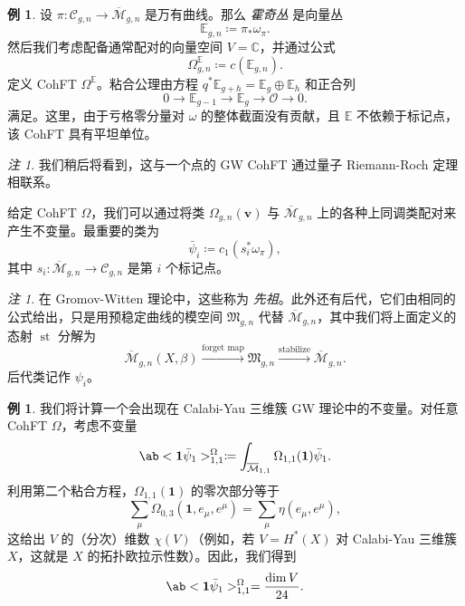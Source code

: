 \documentclass{amsart}
\theoremstyle{definition}
\newtheorem{exm}[thm]{例}
\theoremstyle{remark}
\newtheorem{rmk}[thm]{注}
\theoremstyle{plain}
\theoremstyle{definition}
\theoremstyle{remark}
\newcommand{\C}{\mathbb{C}}
\newcommand{\E}{\mathbb{E}}
\newcommand{\Mbar}{\overline{\mathcal{M}}}
\newcommand{\mc}[1]{\mathcal{#1}}
\newcommand{\mf}[1]{\mathfrak{#1}}
\newcommand{\mbf}[1]{\mathbf{#1}}
\newcommand{\bv}{\mbf{v}}
\newcommand{\1}{\mathbf{1}}
\newcommand{\2}{\mathbf{2}}
\newcommand{\3}{\mathbf{3}}
\DeclareMathOperator{\st}{st}
\begin{document}
\begin{exm}
    设 $\pi \colon \mc{C}_{g,n} \to \Mbar_{g,n}$ 是万有曲线。那么 \textit{霍奇丛} 是向量丛
    \[ \E_{g,n} \coloneqq \pi_* \omega_{\pi}. \]
    然后我们考虑配备通常配对的向量空间 $V = \C$，并通过公式
    \[ \Omega^{\E}_{g,n} \coloneqq c(\E_{g,n}). \]
    定义 CohFT $\Omega^{\E}$。粘合公理由方程 $q^* \E_{g+h} = \E_g \oplus \E_h$ 和正合列
    \[ 0 \to \E_{g-1} \to \E_g \to \mc{O} \to 0. \]
    满足。这里，由于亏格零分量对 $\omega$ 的整体截面没有贡献，且 $\E$ 不依赖于标记点，该 CohFT 具有平坦单位。
\end{exm}

\begin{rmk}
    我们稍后将看到，这与一个点的 GW CohFT 通过量子 Riemann-Roch 定理相联系。
\end{rmk}

给定 CohFT $\Omega$，我们可以通过将类 $\Omega_{g,n}(\bv)$ 与 $\Mbar_{g,n}$ 上的各种上同调类配对来产生不变量。最重要的类为
\[ \bar{\psi}_i \coloneqq c_1( s_i^* \omega_{\pi} ), \]
其中 $s_i \colon \Mbar_{g,n} \to \mc{C}_{g,n}$ 是第 $i$ 个标记点。

\begin{rmk}
    在 Gromov-Witten 理论中，这些称为 \textit{先祖}。此外还有后代，它们由相同的公式给出，只是用预稳定曲线的模空间 $\mf{M}_{g,n}$ 代替 $\Mbar_{g,n}$，其中我们将上面定义的态射 $\st$ 分解为
    \[ \Mbar_{g,n}(X,\beta) \xrightarrow{\text{forget map}} \mf{M}_{g,n} \xrightarrow{\text{stabilize}} \Mbar_{g,n}. \]
    后代类记作 $\psi_i$。
\end{rmk}

\begin{exm}
    我们将计算一个会出现在 Calabi-Yau 三维簇 GW 理论中的不变量。对任意 CohFT $\Omega$，考虑不变量
    \[ \ab<\1\bar{\psi}_1>_{1,1}^{\Omega}\coloneqq \int_{\Mbar_{1,1}} \Omega_{1,1}(\1)\bar{\psi}_1. \]
    利用第二个粘合方程，$\Omega_{1,1}(\1)$ 的零次部分等于
    \[ \sum_{\mu} \Omega_{0,3}(\1, e_{\mu}, e^{\mu}) = \sum_{\mu} \eta(e_{\mu}, e^{\mu}), \]
    这给出 $V$ 的（分次）维数 $\chi(V)$（例如，若 \(V = H^*(X)\) 对 Calabi-Yau 三维簇 \(X\)，这就是 \(X\) 的拓扑欧拉示性数）。因此，我们得到
    \[ \ab<\1\bar{\psi}_1>_{1,1}^{\Omega} = \frac{\dim V}{24}. \]
\end{exm}
\end{document}
